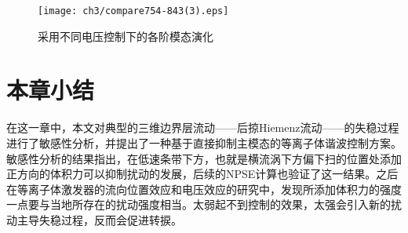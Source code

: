 \begin{figure}
  \centering
  \texttt{[image: ch3/compare754-843(3).eps]}\\
  \caption{采用不同电压控制下的各阶模态演化}\label{f:voltage}
\end{figure}

\section{本章小结}
在这一章中，本文对典型的三维边界层流动——后掠Hiemenz流动——的失稳过程进行了敏感性分析，并提出了一种基于直接抑制主模态的等离子体谐波控制方案。敏感性分析的结果指出，在低速条带下方，也就是横流涡下方偏下扫的位置处添加正方向的体积力可以抑制扰动的发展，后续的NPSE计算也验证了这一结果。之后在等离子体激发器的流向位置效应和电压效应的研究中，发现所添加体积力的强度一点要与当地所存在的扰动强度相当。太弱起不到控制的效果，太强会引入新的扰动主导失稳过程，反而会促进转捩。